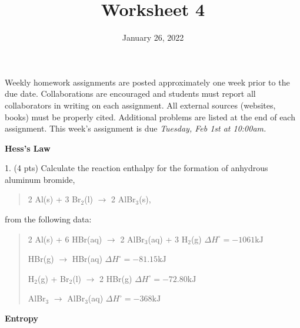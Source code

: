 \documentclass[11pt]{article}
\title{\textbf{Worksheet 4}}
\date{\vspace{-2em}January 26, 2022}
\begin{document}
\maketitle

Weekly homework assignments are posted approximately one week prior to the
due date. Collaborations are encouraged and students must report all collaborators
in writing on each assignment. All external sources (websites, books) must be
properly cited. Additional problems are listed at the end of each assignment.
This week's assignment is due \textit{Tuesday, Feb 1st at 10:00am.}

\textbf{Hess's Law}

1. (4 pts) Calculate the reaction enthalpy for the formation of anhydrous aluminum
bromide,
\begin{quote}
2 Al(s) + 3 Br$_2$(l) $\rightarrow$ 2 AlBr$_3$(s),
\end{quote}
from the following data:
\begin{quote}
2 Al(s) + 6 HBr(aq) $\rightarrow$ 2 AlBr$_3$(aq) + 3 H$_2$(g)  $\Delta H^\circ = - 1061\text{kJ}$

HBr(g) $\rightarrow$ HBr(aq) $\Delta H^\circ = -81.15\text{kJ}$

H$_2$(g) + Br$_2$(l) $\rightarrow$ 2 HBr(g) $\Delta H^\circ = -72.80\text{kJ}$

AlBr$_3$ $\rightarrow$ AlBr$_3$(aq) $\Delta H^\circ = -368\text{kJ}$
\end{quote}

\pagebreak

%
%
%

\textbf{Entropy}
\end{document}
